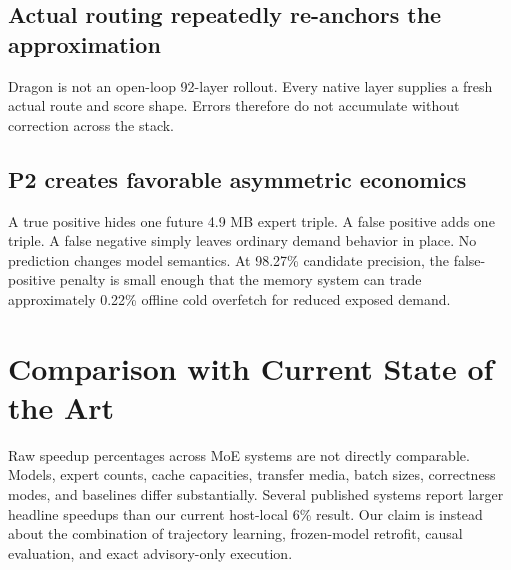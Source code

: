 \documentclass[11pt]{article}
\begin{document}
\subsection{Actual routing repeatedly re-anchors the approximation}

Dragon is not an open-loop 92-layer rollout. Every native layer supplies a fresh actual route and score shape. Errors therefore do not accumulate without correction across the stack.

\subsection{P2 creates favorable asymmetric economics}

A true positive hides one future 4.9 MB expert triple. A false positive adds one triple. A false negative simply leaves ordinary demand behavior in place. No prediction changes model semantics. At 98.27\% candidate precision, the false-positive penalty is small enough that the memory system can trade approximately 0.22\% offline cold overfetch for reduced exposed demand.

\section{Comparison with Current State of the Art}

Raw speedup percentages across MoE systems are not directly comparable. Models, expert counts, cache capacities, transfer media, batch sizes, correctness modes, and baselines differ substantially. Several published systems report larger headline speedups than our current host-local 6\% result. Our claim is instead about the combination of trajectory learning, frozen-model retrofit, causal evaluation, and exact advisory-only execution.
\end{document}

